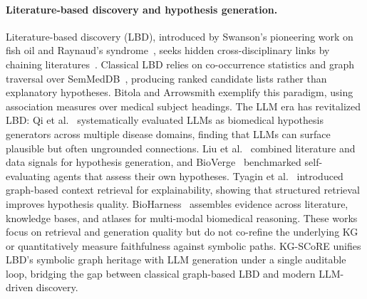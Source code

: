 \paragraph{Literature-based discovery and hypothesis generation.}
Literature-based discovery (LBD), introduced by Swanson's pioneering work on fish oil and Raynaud's syndrome~\cite{swanson1986undiscovered}, seeks hidden cross-disciplinary links by chaining literatures~\cite{hristovski2015constructing,bhasuran2023literature}. Classical LBD relies on co-occurrence statistics and graph traversal over SemMedDB~\cite{kilicoglu2012semmeddb,kilicoglu2020broadcoverage}, producing ranked candidate lists rather than explanatory hypotheses. Bitola and Arrowsmith exemplify this paradigm, using association measures over medical subject headings. The LLM era has revitalized LBD: Qi et al.~\cite{qi2024large} systematically evaluated LLMs as biomedical hypothesis generators across multiple disease domains, finding that LLMs can surface plausible but often ungrounded connections. Liu et al.~\cite{liu2024literature} combined literature and data signals for hypothesis generation, and BioVerge~\cite{yang2025bioverge} benchmarked self-evaluating agents that assess their own hypotheses. Tyagin et al.~\cite{tyagin2025biomedical} introduced graph-based context retrieval for explainability, showing that structured retrieval improves hypothesis quality. BioHarness~\cite{xiao2026bioharness} assembles evidence across literature, knowledge bases, and atlases for multi-modal biomedical reasoning. These works focus on retrieval and generation quality but do not co-refine the underlying KG or quantitatively measure faithfulness against symbolic paths. KG-SCoRE unifies LBD's symbolic graph heritage with LLM generation under a single auditable loop, bridging the gap between classical graph-based LBD and modern LLM-driven discovery.

